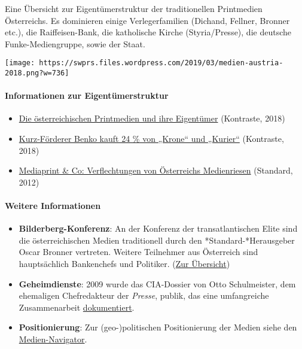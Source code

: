 Eine Übersicht zur Eigentümerstruktur der traditionellen Printmedien
Österreichs. Es dominieren einige Verlegerfamilien (Dichand, Fellner,
Bronner etc.), die Raiffeisen-Bank, die katholische Kirche
(Styria/Presse), die deutsche Funke-Mediengruppe, sowie der Staat.

\texttt{[image: https://swprs.files.wordpress.com/2019/03/medien-austria-2018.png?w=736]}

\hypertarget{informationen-zur-eigentuxfcmerstruktur}{%
\paragraph{Informationen zur
Eigentümerstruktur}\label{informationen-zur-eigentuxfcmerstruktur}}

\begin{itemize}
\tightlist
\item
  \href{https://kontrast.at/medien-oesterreich/}{Die österreichischen
  Printmedien und ihre Eigentümer} (Kontraste, 2018)
\item
  \href{https://kontrast.at/rene-benko-krone-kurier-kurz/}{Kurz-Förderer
  Benko kauft 24 \% von „Krone`` und „Kurier``} (Kontraste, 2018)
\item
  \href{https://derstandard.at/1334132435092/Bilanz-Nur-Zwischenhoch-fuer-Mediaprint}{Mediaprint
  \& Co: Verflechtungen von Österreichs Medienriesen} (Standard, 2012)
\end{itemize}

\hypertarget{weitere-informationen}{%
\paragraph{Weitere Informationen}\label{weitere-informationen}}

\begin{itemize}
\tightlist
\item
  \textbf{Bilderberg-Konferenz}: An der Konferenz der transatlantischen
  Elite sind die österreichischen Medien traditionell durch den
  *Standard-*Herausgeber Oscar Bronner vertreten. Weitere Teilnehmer aus
  Österreich sind hauptsächlich Bankenchefs und Politiker.
  (\href{https://swprs.org/medien-in-oesterreich/bilderberger-teilnehmer-oesterreich/}{Zur
  Übersicht})
\item
  \textbf{Geheimdienste}: 2009 wurde das CIA-Dossier von Otto
  Schulmeister, dem ehemaligen Chefredakteur der \emph{Presse}, publik,
  das eine umfangreiche Zusammenarbeit
  \href{https://swprs.org/der-chefredakteur-und-die-cia/}{dokumentiert}.
\item
  \textbf{Positionierung}: Zur (geo-)politischen Positionierung der
  Medien siehe den
  \href{https://swprs.org/medien-navigator/}{Medien-Navigator}.
\end{itemize}

